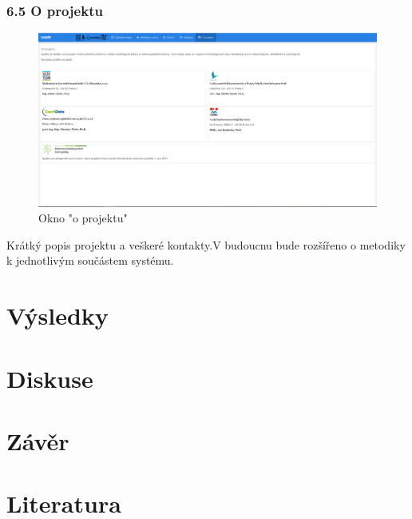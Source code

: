\documentclass[12pt,]{article}
\begin{document}
\subsubsection{6.5 O projektu}\label{o-projektu}

\begin{figure}[H]
      \includegraphics[width=\textwidth]{fig/P_o_projektu}
      \caption{Okno "o projektu"}
      \label{fig:ch5.7}
\end{figure}

Krátký popis projektu a veškeré kontakty.V budoucnu bude rozšířeno o
metodiky k jednotlivým součástem systému.

\newpage

\section*{Výsledky}\label{vysledky}

\newpage

\section*{Diskuse}\label{diskuse}

\newpage

\section*{Závěr}\label{zaver}

\newpage

\section{Literatura}\label{literatura}

\label{literatura}
\end{document}
